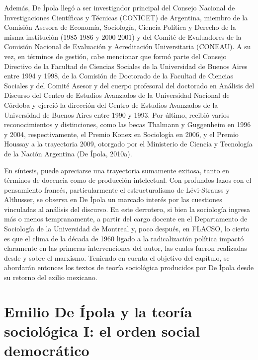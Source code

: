 Además, De Ípola llegó a ser investigador principal del Consejo Nacional de Investigaciones Científicas y Técnicas (CONICET) de Argentina, miembro de la Comisión Asesora de Economía, Sociología, Ciencia Política y Derecho de la misma institución (1985-1986 y 2000-2001) y del Comité de Evaluadores de la Comisión Nacional de Evaluación y Acreditación Universitaria (CONEAU). A su vez, en términos de gestión, cabe mencionar que formó parte del Consejo Directivo de la Facultad de Ciencias Sociales de la Universidad de Buenos Aires entre 1994 y 1998, de la Comisión de Doctorado de la Facultad de Ciencias Sociales y del Comité Asesor y del cuerpo profesoral del doctorado en Análisis del Discurso del Centro de Estudios Avanzados de la Universidad Nacional de Córdoba y ejerció la dirección del Centro de Estudios Avanzados de la Universidad de Buenos Aires entre 1990 y 1993. Por último, recibió varios reconocimientos y distinciones, como las becas Thalmann y Guggenheim en 1996 y 2004, respectivamente, el Premio Konex en Sociología en 2006, y el Premio Houssay a la trayectoria 2009, otorgado por el Ministerio de Ciencia y Tecnología de la Nación Argentina (De Ípola, 2010a).

En síntesis, puede apreciarse una trayectoria sumamente exitosa, tanto en términos de docencia como de producción intelectual. Con profundos lazos con el pensamiento francés, particularmente el estructuralismo de Lévi-Strauss y Althusser, se observa en De Ípola un marcado interés por las cuestiones vinculadas al análisis del discurso. En este derrotero, si bien la sociología ingresa más o menos tempranamente, a partir del cargo docente en el Departamento de Sociología de la Universidad de Montreal y, poco después, en FLACSO, lo cierto es que el clima de la década de 1960 ligado a la radicalización política impactó claramente en las primeras intervenciones del autor, las cuales fueron realizadas desde y sobre el marxismo. Teniendo en cuenta el objetivo del capítulo, se abordarán entonces los textos de teoría sociológica producidos por De Ípola desde su retorno del exilio mexicano.

\section{Emilio De Ípola y la teoría sociológica I: el orden social democrático}

